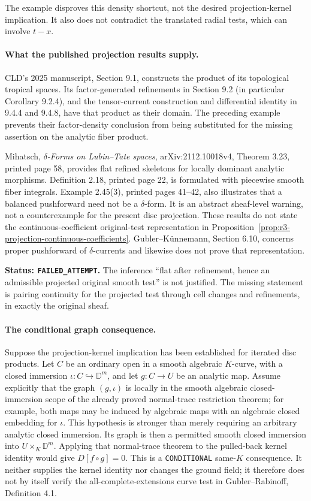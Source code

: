 \documentclass[11pt,a4paper]{article}
\numberwithin{equation}{section}
\theoremstyle{definition}
\theoremstyle{remark}
\begin{document}
The example disproves this density shortcut, not the desired
projection-kernel implication. It also does not contradict the
translated radial tests, which can involve $t-x$.

\paragraph{What the published projection results supply.}
CLD's 2025 manuscript, Section 9.1, constructs the product of its
topological tropical spaces. Its factor-generated refinements in
Section 9.2 (in particular Corollary 9.2.4), and the tensor-current
construction and differential identity in 9.4.4 and 9.4.8, have
that product as their domain. The preceding example prevents their
factor-density conclusion from being substituted for the missing
assertion on the analytic fiber product.

Mihatsch, \emph{$\delta$-Forms on Lubin--Tate spaces},
arXiv:2112.10018v4, Theorem 3.23, printed page 58, provides flat
refined skeletons for locally dominant analytic morphisms.
Definition 2.18, printed page 22, is formulated with piecewise
smooth fiber integrals. Example 2.45(3), printed pages 41--42,
also illustrates that a balanced pushforward need not be a
$\delta$-form. It is an abstract sheaf-level warning, not a
counterexample for the present disc projection. These results do
not state the continuous-coefficient original-test representation
in Proposition~\ref{prop:r3-projection-continuous-coefficients}.
Gubler--K\"unnemann, Section 6.10, concerns proper pushforward of
$\delta$-currents and likewise does not prove that representation.

\noindent\textbf{Status: \texttt{FAILED\_ATTEMPT}.}
The inference ``flat after refinement, hence an admissible projected
original smooth test'' is not justified. The missing statement is
pairing continuity for the projected test through cell changes and
refinements, in exactly the original sheaf.

\paragraph{The conditional graph consequence.}
Suppose the projection-kernel implication has been established for
iterated disc products. Let $C$ be an ordinary open in a smooth
algebraic $K$-curve, with a closed immersion
$\iota:C\hookrightarrow\mathbb D^m$, and let $g:C\to U$ be an
analytic map. Assume explicitly that the graph $(g,\iota)$ is
locally in the smooth algebraic closed-immersion scope of the
already proved normal-trace restriction theorem; for example,
both maps may be induced by algebraic maps with an algebraic
closed embedding for $\iota$. This hypothesis is stronger than
merely requiring an arbitrary analytic closed immersion.
Its graph is then a permitted smooth closed immersion into
$U\times_K\mathbb D^m$.
Applying that normal-trace theorem to the pulled-back kernel
identity would give $D[f\circ g]=0$. This is a
\texttt{CONDITIONAL} same-$K$ consequence. It neither supplies
the kernel identity nor changes the ground field; it therefore
does not by itself verify the all-complete-extensions curve test
in Gubler--Rabinoff, Definition 4.1.
\end{document}
